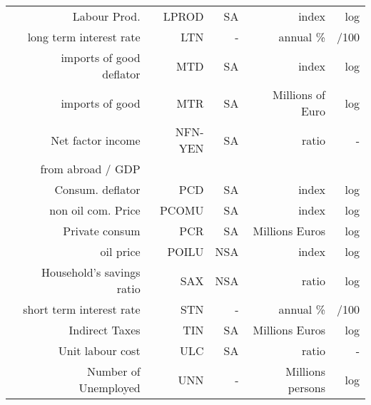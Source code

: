 \documentclass[11pt,a4paper]{article}
\begin{document}
\begin{table}[htbp]
{\begin{tabular}{rrrrrr}
      \multicolumn{1}{c}{} &
      Labour Prod.   &
      LPROD &
      SA &
      index &
      log
      \\
      \multicolumn{1}{c}{} &
      long term interest rate &
      LTN &
      - &
      annual \% &
      /100
      \\
      
    
    \multicolumn{1}{c}{} &
      imports of good deflator &
      MTD &
      SA &
      index &
      log
      \\
    \multicolumn{1}{c}{} &
      imports of good &
      MTR &
      SA &
      Millions of Euro &
      log
      \\
    
    \multicolumn{1}{c}{} &
      Net factor income &
      NFN-YEN &
      SA &
      ratio &
      -
      \\
      \multicolumn{1}{c}{} &
      from abroad / GDP &
       &
       &
       &
      
      \\
      \multicolumn{1}{c}{} &
      Consum. deflator &
      PCD &
      SA &
      index &
      log
      \\
      \multicolumn{1}{c}{} &
      non oil com. Price &
      PCOMU &
      SA &
      index &
      log
      \\
      
      \multicolumn{1}{c}{} &
      Private consum &
      PCR &
      SA &
      Millions Euros &
      log
      \\
      
      \multicolumn{1}{c}{} &
      oil price &
      POILU &
      NSA &
      index &
      log
      \\

      \multicolumn{1}{c}{} &
      Household's savings ratio &
      SAX &
      NSA &
      ratio &
      log
      \\

      \multicolumn{1}{c}{} &
      short term interest rate &
      STN &
      - &
      annual \% &
      /100
      \\

      \multicolumn{1}{c}{} &
      Indirect Taxes &
      TIN &
      SA &
      Millions Euros &
      log
      \\
      
      \multicolumn{1}{c}{} &
      Unit labour cost &
      ULC &
      SA &
      ratio &
      -
      \\
      
      \multicolumn{1}{c}{} &
      Number of Unemployed &
      UNN &
      - &
      Millions persons &
      log
      \\



\end{tabular}}
\end{table}
\end{document}
